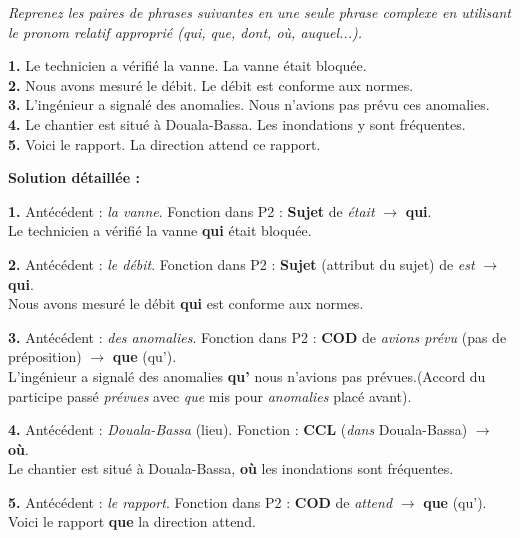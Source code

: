 \documentclass[11pt]{article}
\begin{document}
\begin{exoresolu}
\emph{Reprenez les paires de phrases suivantes en une seule phrase complexe en utilisant le pronom relatif approprié (qui, que, dont, où, auquel...).}

\textbf{1.} Le technicien a vérifié la vanne. La vanne était bloquée. \\
\textbf{2.} Nous avons mesuré le débit. Le débit est conforme aux normes. \\
\textbf{3.} L'ingénieur a signalé des anomalies. Nous n'avions pas prévu ces anomalies. \\
\textbf{4.} Le chantier est situé à Douala-Bassa. Les inondations y sont fréquentes. \\
\textbf{5.} Voici le rapport. La direction attend ce rapport.

\tcblower
\textbf{Solution détaillée :}

\textbf{1.} Antécédent : \emph{la vanne}. Fonction dans P2 : \textbf{Sujet} de \emph{était} $\rightarrow$ \textbf{qui}. \\
\og Le technicien a vérifié la vanne \textbf{qui} était bloquée.\fg

\textbf{2.} Antécédent : \emph{le débit}. Fonction dans P2 : \textbf{Sujet} (attribut du sujet) de \emph{est} $\rightarrow$ \textbf{qui}. \\
\og Nous avons mesuré le débit \textbf{qui} est conforme aux normes.\fg

\textbf{3.} Antécédent : \emph{des anomalies}. Fonction dans P2 : \textbf{COD} de \emph{avions prévu} (pas de préposition) $\rightarrow$ \textbf{que} (qu'). \\
\og L'ingénieur a signalé des anomalies \textbf{qu'} nous n'avions pas prévues.\fg (Accord du participe passé \emph{prévues} avec \emph{que} mis pour \emph{anomalies} placé avant).

\textbf{4.} Antécédent : \emph{Douala-Bassa} (lieu). Fonction : \textbf{CCL} (\emph{dans} Douala-Bassa) $\rightarrow$ \textbf{où}. \\
\og Le chantier est situé à Douala-Bassa, \textbf{où} les inondations sont fréquentes.\fg

\textbf{5.} Antécédent : \emph{le rapport}. Fonction dans P2 : \textbf{COD} de \emph{attend} $\rightarrow$ \textbf{que} (qu'). \\
\og Voici le rapport \textbf{que} la direction attend.\fg
\end{exoresolu}
\end{document}
